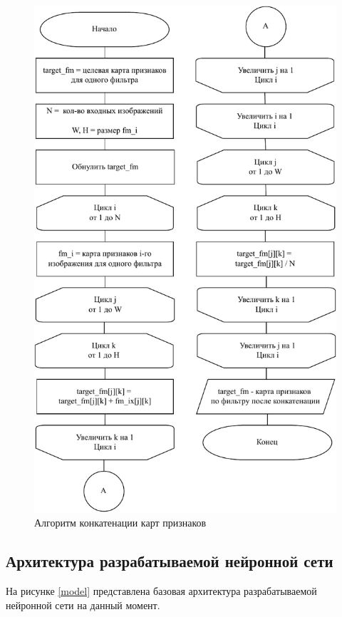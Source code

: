 \begin{figure}[H]
    \centering
    \includegraphics[scale=1]{assets/concat.pdf}
    \caption{Алгоритм конкатенации карт признаков}
    \label{data-proc}
\end{figure}

\clearpage

\subsection{Архитектура разрабатываемой нейронной сети}

На рисунке \ref{model} представлена базовая архитектура \cite{train3, train4} разрабатываемой нейронной сети на данный момент.


